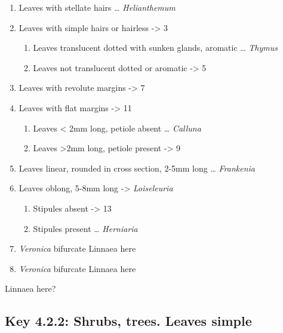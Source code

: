 \documentclass[openany]{book}
\providecommand{\tightlist}{%
  \setlength{\itemsep}{0pt}\setlength{\parskip}{0pt}}
\begin{document}
\begin{enumerate}
\def\labelenumi{\arabic{enumi}.}
\tightlist
\item
  Leaves with stellate hairs \ldots{} \emph{Helianthemum}
\item
  Leaves with simple hairs or hairless -\textgreater{} 3

  \begin{enumerate}
  \def\labelenumii{\arabic{enumii}.}
  \setcounter{enumii}{2}
  \tightlist
  \item
    Leaves translucent dotted with sunken glands, aromatic \ldots{} \emph{Thymus}
  \item
    Leaves not translucent dotted or aromatic -\textgreater{} 5
  \end{enumerate}
\item
  Leaves with revolute margins -\textgreater{} 7
\item
  Leaves with flat margins -\textgreater{} 11

  \begin{enumerate}
  \def\labelenumii{\arabic{enumii}.}
  \setcounter{enumii}{6}
  \tightlist
  \item
    Leaves \textless{} 2mm long, petiole absent \ldots{} \emph{Calluna}
  \item
    Leaves \textgreater{}2mm long, petiole present -\textgreater{} 9
  \end{enumerate}
\item
  Leaves linear, rounded in cross section, 2-5mm long \ldots{} \emph{Frankenia}
\item
  Leaves oblong, 5-8mm long -\textgreater{} \emph{Loiseleuria}

  \begin{enumerate}
  \def\labelenumii{\arabic{enumii}.}
  \setcounter{enumii}{10}
  \tightlist
  \item
    Stipules absent -\textgreater{} 13
  \item
    Stipules present \ldots{} \emph{Herniaria}
  \end{enumerate}
\item
  \emph{Veronica} bifurcate Linnaea here
\item
  \emph{Veronica} bifurcate Linnaea here
\end{enumerate}

Linnaea here?

\hypertarget{key-4.2.2-shrubs-trees.-leaves-simple}{%
\subsection*{Key 4.2.2: Shrubs, trees. Leaves simple}\label{key-4.2.2-shrubs-trees.-leaves-simple}}
\end{document}
